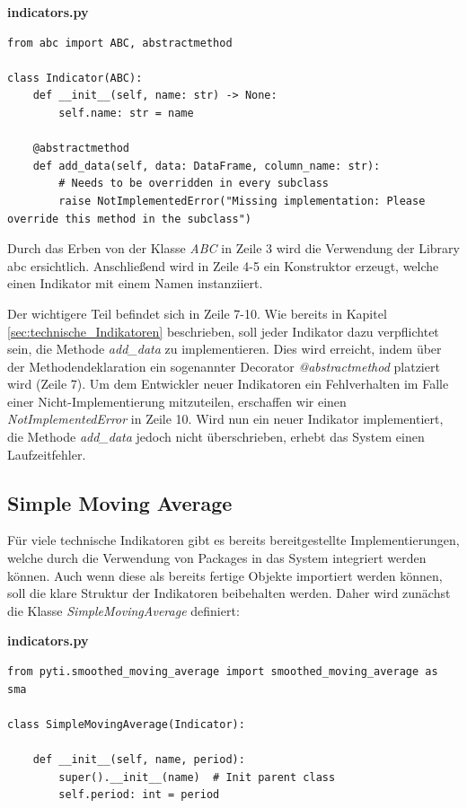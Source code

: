 \documentclass[oneside]{ausarbeitung}
\begin{document}
\lstset{language=Python}
\lstset{frame=lines}
\lstset{basicstyle=\footnotesize}
\textbf{indicators.py}
\begin{lstlisting}
from abc import ABC, abstractmethod

class Indicator(ABC):
    def __init__(self, name: str) -> None:
        self.name: str = name

    @abstractmethod
    def add_data(self, data: DataFrame, column_name: str):
        # Needs to be overridden in every subclass
        raise NotImplementedError("Missing implementation: Please override this method in the subclass")
\end{lstlisting}

Durch das Erben von der Klasse \textit{ABC} in Zeile 3 wird die Verwendung der Library \ac{abc} ersichtlich. Anschließend wird in Zeile 4-5 ein Konstruktor erzeugt, welche einen Indikator mit einem Namen instanziiert.

Der wichtigere Teil befindet sich in Zeile 7-10. Wie bereits in Kapitel \ref{sec:technische_Indikatoren} beschrieben, soll jeder Indikator dazu verpflichtet sein, die Methode \textit{add\_data} zu implementieren. Dies wird erreicht, indem über der Methodendeklaration ein sogenannter Decorator \textit{@abstractmethod} platziert wird (Zeile 7). Um dem Entwickler neuer Indikatoren ein Fehlverhalten im Falle einer Nicht-Implementierung mitzuteilen, erschaffen wir einen \textit{NotImplementedError} in Zeile 10. Wird nun ein neuer Indikator implementiert, die Methode \textit{add\_data} jedoch nicht überschrieben, erhebt das System einen Laufzeitfehler.

\subsection{Simple Moving Average}
\label{sub:simple_moving_average}

Für viele technische Indikatoren gibt es bereits bereitgestellte Implementierungen, welche durch die Verwendung von Packages in das System integriert werden können. Auch wenn diese als bereits fertige Objekte importiert werden können, soll die klare Struktur der Indikatoren beibehalten werden. Daher wird zunächst die Klasse \textit{SimpleMovingAverage} definiert:

\lstset{language=Python}
\lstset{frame=lines}
\lstset{basicstyle=\footnotesize}
\textbf{indicators.py}
\begin{lstlisting}
from pyti.smoothed_moving_average import smoothed_moving_average as sma

class SimpleMovingAverage(Indicator):

    def __init__(self, name, period):
        super().__init__(name)  # Init parent class
        self.period: int = period
\end{lstlisting}
\end{document}
